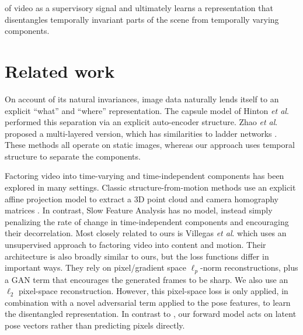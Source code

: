 \documentclass{article}
\newcommand{\etal}{\textit{et al}.\:}
\begin{document}
of video as a supervisory signal and ultimately learns a representation that disentangles temporally invariant parts of the scene from temporally varying components. %
\vspace{-6mm}\section{Related work}\vspace{-2mm}
On account of its natural invariances, image data naturally lends
itself to an explicit ``what'' and ``where'' representation. The
capsule model of Hinton \etal\cite{Hinton11} performed this
separation via an explicit auto-encoder structure. Zhao \etal\cite{zhao2016} proposed a multi-layered version, which has
similarities to ladder networks \cite{ramus2015}. These methods all
operate on static images, whereas our approach uses temporal structure
to separate the components.

Factoring video into time-varying and time-independent components has
been explored in many settings. Classic structure-from-motion methods
use an explicit affine projection model to extract a 3D point cloud
and camera homography matrices \cite{hartley2000multiple}. In
contrast, Slow Feature Analysis \cite{Wiskott02} has no model, instead
simply penalizing the rate of change in time-independent components and
encouraging their decorrelation. Most closely related to ours is
Villegas \etal\cite{Villegas17} which uses an unsupervised approach to factoring
video into content and motion. Their architecture is also broadly similar to
ours, but the loss functions differ in important ways. They rely on
pixel/gradient space $\ell_p$-norm reconstructions, plus a GAN term
\cite{goodfellow2014} that encourages the generated frames to be sharp. 
We also use an $\ell_2$ pixel-space reconstruction. However, this pixel-space loss is only applied, in combination with a novel adversarial term applied to the pose features, to learn the disentangled representation.
In contrast to \cite{Villegas17}, our forward model acts on latent pose vectors rather than predicting pixels directly. 
\end{document}
